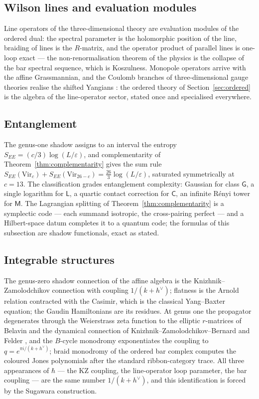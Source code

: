 \documentclass[11pt]{amsart}
\numberwithin{equation}{section}
\theoremstyle{plain}
\theoremstyle{definition}
\theoremstyle{remark}
\newcommand{\Vir}{\mathrm{Vir}}
\newcommand{\dvee}{h^{\vee}}
\begin{document}
\subsection{Wilson lines and evaluation modules}

Line operators of the three-dimensional theory are evaluation modules
of the ordered dual: the spectral parameter is the holomorphic
position of the line, braiding of lines is the $R$-matrix, and the
operator product of parallel lines is one-loop exact --- the
non-renormalisation theorem of the physics is the collapse of the bar
spectral sequence, which is Koszulness. Monopole operators arrive
with the affine Grassmannian, and the Coulomb branches of
three-dimensional gauge theories realise the shifted Yangians \cite{BFN}: the
ordered theory of Section~\ref{sec:ordered} is the algebra of the
line-operator sector, stated once and specialised everywhere.

\subsection{Entanglement}

The genus-one shadow assigns to an interval the entropy
$S_{EE}=(c/3)\log(L/\varepsilon)$, and complementarity of
Theorem~\ref{thm:complementarity} gives the sum rule
$S_{EE}(\Vir_c)+S_{EE}(\Vir_{26-c})=\tfrac{26}{3}\log(L/\varepsilon)$,
saturated symmetrically at $c=13$. The classification grades
entanglement complexity: Gaussian for class $\mathsf{G}$, a single
logarithm for $\mathsf{L}$, a quartic contact correction for
$\mathsf{C}$, an infinite R\'enyi tower for $\mathsf{M}$. The
Lagrangian splitting of Theorem~\ref{thm:complementarity} is a
symplectic code --- each summand isotropic, the cross-pairing perfect
--- and a Hilbert-space datum completes it to a quantum code; the
formulas of this subsection are shadow functionals, exact as stated.

\subsection{Integrable structures}

The genus-zero shadow connection of the affine algebra is the
Knizhnik--Zamolodchikov connection with coupling $1/(k+\dvee)$;
flatness is the Arnold relation contracted with the Casimir, which is
the classical Yang--Baxter equation; the Gaudin Hamiltonians are its
residues. At genus one the propagator degenerates through the
Weierstrass zeta function to the elliptic $r$-matrices of Belavin and
the dynamical connection of Knizhnik--Zamolodchikov--Bernard and Felder \cite{Felder}, and the
$B$-cycle monodromy exponentiates the coupling to
$q=e^{\pi i/(k+\dvee)}$; braid monodromy of the ordered bar complex
computes the coloured Jones polynomials after the standard
ribbon-category trace. All three appearances of $\hbar$ --- the
KZ coupling, the line-operator loop parameter, the bar coupling ---
are the same number $1/(k+\dvee)$, and this identification is forced
by the Sugawara construction.
\end{document}
